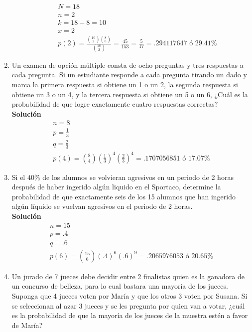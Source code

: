\begin{enumerate}
\begin{enumerate}
        \begin{gather*}
            N=18\\
            n=2\\
            k=18-8=10\\
            x=2\\
            p(2) = \frac{\binom{10}{2}\binom{8}{0}}{\binom{18}{2}} = \frac{45}{153} =\frac{5}{17} =.294117647 \text{ ó } 29.41\%
        \end{gather*}
	\end{enumerate}
	\item Un examen de opción múltiple consta de ocho preguntas y tres respuestas a cada pregunta. Si un estudiante responde a cada pregunta tirando un dado y marca la primera respuesta si obtiene un 1 o un 2, la segunda respuesta si obtiene un 3 o un 4, y la tercera respuesta si obtiene un 5 o un 6, ¿Cuál es la probabilidad de que logre exactamente cuatro respuestas correctas?
    \\\textbf{Solución}
    \\
    \begin{gather*}
        n=8\\
        p=\frac{1}{3}\\
        q=\frac{2}{3}\\
        p(4) = \binom{8}{4}(\frac{1}{3})^{4}(\frac{2}{3})^{4}=.1707056851 \text{ ó } 17.07\%
    \end{gather*}
	\item Si el $40\%$ de los alumnos se volvieran agresivos en un periodo de 2 horas después de haber ingerido algún liquido en el Sportaco, determine la probabilidad de que exactamente seis de los 15 alumnos que han ingerido algún líquido se vuelvan agresivos en el periodo de 2 horas.
    \\\textbf{Solución}
    \\
    \begin{gather*}
        n=15\\
        p=.4\\
        q=.6\\
        p(6) = \binom{15}{6}(.4)^{6}(.6)^{9}=.2065976053 \text{ ó } 20.65\%
    \end{gather*}
	\item Un jurado de 7 jueces debe decidir entre 2 finalistas quien es la ganadora de un concurso de belleza, para lo cual bastara una mayoría de los jueces. Suponga que 4 jueces voten por María y que los otros 3 voten por Susana. Si se seleccionan al azar 3 jueces y se les pregunta por quien van a votar, ¿cuál es la probabilidad de que la mayoría de los jueces de la muestra estén a favor de María?

\end{enumerate}
